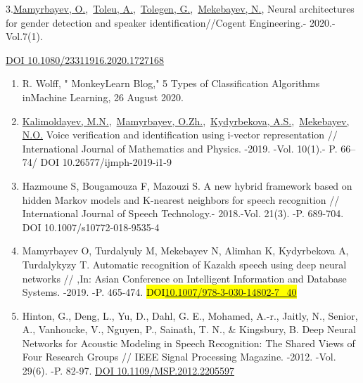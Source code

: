 \documentclass[
]{article}
\begin{document}
3.\href{https://www.scopus.com/authid/detail.uri?authorId=55967630400}{Mamyrbayev,
O.},~\href{https://www.scopus.com/authid/detail.uri?authorId=57200275502}{Toleu,
A.},~\href{https://www.scopus.com/authid/detail.uri?authorId=57200276217}{Tolegen,
G.},~\href{https://www.scopus.com/authid/detail.uri?authorId=57202316868}{Mekebayev,
N.}, Neural architectures for gender detection and speaker
identification//Cogent Engineering.- 2020.-Vol.7(1).

\href{https://doi.org/10.1080/23311916.2020.1727168}{DOI
10.1080/23311916.2020.1727168}

\begin{enumerate}
\def\labelenumi{\arabic{enumi}.}
\setcounter{enumi}{2}
\item
  R. Wolff, " MonkeyLearn Blog," 5 Types of Classification Algorithms
  inMachine Learning, 26 August 2020.
\item
  \href{https://www.scopus.com/authid/detail.uri?authorId=56153126500}{Kalimoldayev,
  M.N.},~\href{https://www.scopus.com/authid/detail.uri?authorId=55967630400}{Mamyrbayev,
  O.Zh.},~\href{https://www.scopus.com/authid/detail.uri?authorId=57208346238}{Kydyrbekova,
  A.S.},~\href{https://www.scopus.com/authid/detail.uri?authorId=57202316868}{Mekebayev,
  N.O.} Voice verification and identification using i-vector
  representation // International Journal of Mathematics and Physics.
  -2019. -Vol. 10(1).- P. 66--74/ DOI 10.26577/ijmph-2019-i1-9
\item
  Hazmoune S, Bougamouza F, Mazouzi S. A new hybrid framework based on
  hidden Markov models and K-nearest neighbors for speech recognition //
  International Journal of Speech Technology.- 2018.-Vol. 21(3). -P.
  689-704. DOI 10.1007/s10772-018-9535-4
\item
  Mamyrbayev O, Turdalyuly M, Mekebayev N, Alimhan K, Kydyrbekova A,
  Turdalykyzy T. Automatic recognition of Kazakh speech using deep
  neural networks // ,In: Asian Conference on Intelligent Information
  and Database Systems. -2019. -P. 465-474.
  \hl{DOI\href{http://dx.doi.org/10.1007/978-3-030-14802-7_40}{10.1007/978-3-030-14802-7\_40}}
\item
  Hinton, G., Deng, L., Yu, D., Dahl, G. E., Mohamed, A.-r., Jaitly, N.,
  Senior, A., Vanhoucke, V., Nguyen, P., Sainath, T. N., \& Kingsbury,
  B. Deep Neural Networks for Acoustic Modeling in Speech Recognition:
  The Shared Views of Four Research Groups // IEEE Signal Processing
  Magazine. -2012. -Vol. 29(6). -P. 82-97.
  \href{https://doi.org/10.1109/MSP.2012.2205597}{DOI
  10.1109/MSP.2012.2205597}

\end{enumerate}
\end{document}
